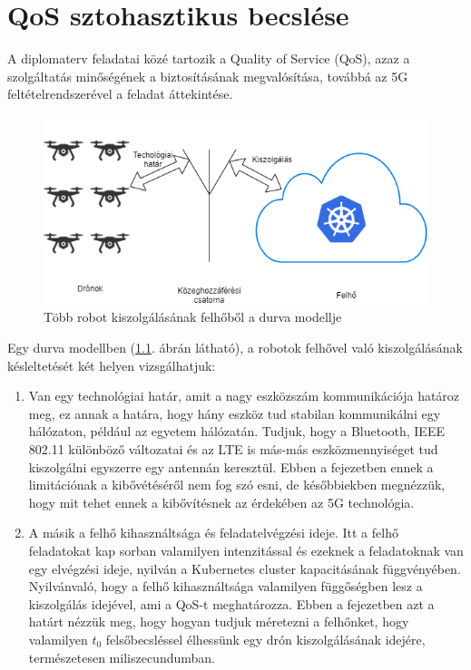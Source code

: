 \chapter{QoS sztohasztikus becslése}
A diplomaterv feladatai közé tartozik a Quality of Service (QoS), azaz a szolgáltatás minőségének a biztosításának megvalósítása, továbbá az 5G feltételrendszerével a feladat áttekintése.
\begin{figure}
	\centering
	\includegraphics[width=\linewidth]{figures/qos.png}
	\caption{Több robot kiszolgálásának felhőből a durva modellje}
	\label{fig:qos}
\end{figure}
Egy durva modellben (\ref{fig:qos}. ábrán látható), a robotok felhővel való kiszolgálásának késleltetését két helyen vizsgálhatjuk:
\begin{enumerate}
\item Van egy technológiai határ, amit a nagy eszközszám kommunikációja határoz meg, ez annak a határa, hogy hány eszköz tud stabilan kommunikálni egy hálózaton, például az egyetem hálózatán. Tudjuk, hogy a Bluetooth, IEEE 802.11 különböző változatai és az LTE is más-más eszközmennyiséget tud kiszolgálni egyszerre egy antennán keresztül. Ebben a fejezetben ennek a limitációnak a kibővétéséről nem fog szó esni, de későbbiekben megnézzük, hogy mit tehet ennek a kibővítésnek az érdekében az 5G technológia.
\item A másik a felhő kihasználtsága és feladatelvégzési ideje. Itt a felhő feladatokat kap sorban valamilyen intenzitással és ezeknek a feladatoknak van egy elvégzési ideje, nyilván a Kubernetes cluster kapacitásának függvényében. Nyilvánvaló, hogy a felhő kihasználtsága valamilyen függőségben lesz a kiszolgálás idejével, ami a QoS-t meghatározza. Ebben a fejezetben azt a határt nézzük meg, hogy hogyan tudjuk méretezni a felhőnket, hogy valamilyen $t_0$ felsőbecsléssel élhessünk egy drón kiszolgálásának idejére, természetesen miliszecundumban.
\end{enumerate}

